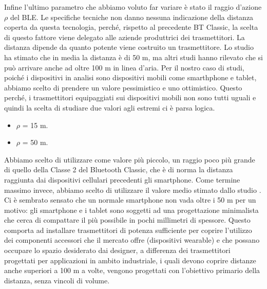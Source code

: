 Infine l'ultimo parametro che abbiamo voluto far variare è stato il raggio d'azione $\rho$ del BLE. Le specifiche tecniche non danno nessuna indicazione della distanza coperta da questa tecnologia, perché, rispetto al precedente BT Classic, la scelta di questo fattore viene delegato alle aziende produttrici dei trasmettitori. La distanza dipende da quanto potente viene costruito un trasmettitore.
Lo studio \cite{tesi_tibertoa2013} ha stimato che in media la distanza è di 50 m, ma altri studi hanno rilevato che si può arrivare anche ad oltre 100 m in linea d'aria. Per il nostro caso di studi, poiché i dispositivi in analisi sono dispositivi mobili come smarthphone e tablet, abbiamo scelto di prendere un valore pessimistico e uno ottimistico. Questo perché, i trasmettitori equipaggiati sui dispositivi mobili non sono tutti uguali e quindi la scelta di studiare due valori agli estremi ci è parsa logica.
\medskip
{}
\begin{itemize}
	\item $\rho$ = 15 m.
	\item $\rho$ = 50 m.
\end{itemize}
Abbiamo scelto di utilizzare come valore più piccolo, un raggio poco più grande di quello della Classe 2 del Bluetooth Classic, che è di norma la distanza raggiunta dai dispositivi cellulari precedenti gli smartphone. Come termine massimo invece, abbiamo scelto di utilizzare il valore medio stimato dallo studio \cite{tesi_tibertoa2013}. Ci è sembrato sensato che un normale smartphone non vada oltre i 50 m per un motivo: gli smartphone e i tablet sono soggetti ad una progettazione minimalista che cerca di compattare il più possibile in pochi millimetri di spessore. Questo comporta ad installare trasmettitori di potenza sufficiente per coprire l'utilizzo dei componenti accessori che il mercato offre (dispositivi wearable) e che possano occupare lo spazio desiderato dai designer, a differenza dei trasmettitori progettati per applicazioni in ambito industriale, i quali devono coprire distanze anche superiori a 100 m a volte, vengono progettati con l'obiettivo primario della distanza, senza vincoli di volume.

